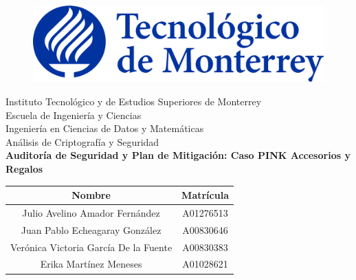 \documentclass[10pt]{article}
\begin{document}
    \begin{titlepage}
        \begin{center}
            \begin{figure}
                \centering
                \includegraphics[scale=0.13]{../img/logo_itesm.png}\\ %
            \end{figure}
            \vspace{5cm}
            \LARGE{Instituto Tecnológico y de Estudios Superiores de Monterrey}\\
            \vspace{1cm}
            \large Escuela de Ingeniería y Ciencias \\
            \vspace{0.2cm}
            \large Ingeniería en Ciencias de Datos y Matemáticas \\
            \vspace{0.2cm}
            \large Análisis de Criptografía y Seguridad\\
            \vspace{1cm}
            \textbf{Auditoría de Seguridad y Plan de Mitigación: Caso PINK Accesorios y Regalos}\\ %
            \vspace{0.7cm}
            \begin{table}[h!]
                \centering
                \begin{tabular}{ ||c|c|| }
                    \hline
                    Nombre & Matrícula \\
                    \hline
                    Julio Avelino Amador Fernández & A01276513 \\
                    \hline
                    Juan Pablo Echeagaray González & A00830646 \\
                    \hline
                    Verónica Victoria García De la Fuente & A00830383 \\
                    \hline
                    Erika Martínez Meneses & A01028621 \\

\end{tabular}
\end{table}
\end{center}
\end{titlepage}
\end{document}
